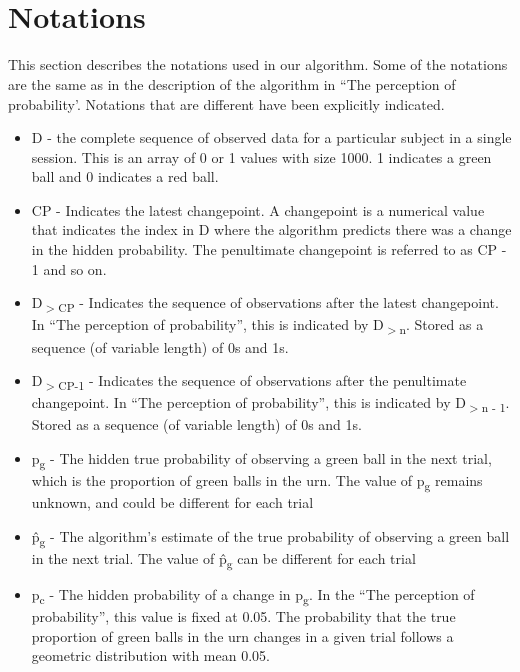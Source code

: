 \documentclass{article}
\begin{document}



\newpage
\appendix
\section{\\Notations}
This section describes the notations used in our algorithm. Some of the notations are the same as in the description of the algorithm in ``The perception of probability'. Notations that are different have been explicitly indicated.
\begin{itemize}
\item D - the complete sequence of observed data for a particular subject in a single session. This is an array of 0 or 1 values with size 1000. 1 indicates a green ball and 0 indicates a red ball.

\item CP - Indicates the latest changepoint. A changepoint is a numerical value that indicates the index in D where the algorithm predicts there was a change in the hidden probability. The penultimate changepoint is referred to as CP - 1 and so on.

\item D\textsubscript{$>$CP} - Indicates the sequence of observations after the latest changepoint. In ``The perception of probability'', this is indicated by D\textsubscript{$>$n}. Stored as a sequence (of variable length) of 0s and 1s.

\item D\textsubscript{$>$CP-1} - Indicates the sequence of observations after the penultimate changepoint. In ``The perception of probability'', this is indicated by D\textsubscript{$>$n - 1}. Stored as a sequence (of variable length) of 0s and 1s.

\item p\textsubscript{g} - The hidden true probability of observing a green ball in the next trial, which is the proportion of green balls in the urn. The value of p\textsubscript{g} remains unknown, and could be different for each trial

\item \^{p\textsubscript{g}} - The algorithm's estimate of the true probability of observing a green ball in the next trial.  The value of \^{p\textsubscript{g}} can be different for each trial

\item p\textsubscript{c} - The hidden probability of a change in p\textsubscript{g}. In the ``The perception of probability'', this value is fixed at 0.05. The probability that the true proportion of green balls in the urn changes in a given trial follows a geometric distribution with mean 0.05. 


\end{itemize}
\end{document}
